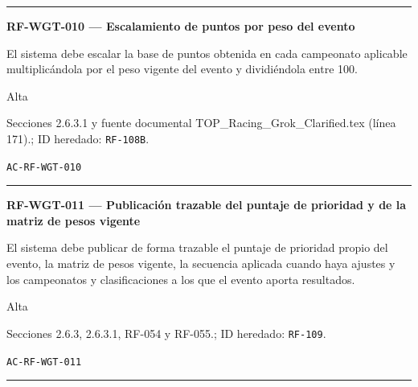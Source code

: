 \documentclass[10pt,letterpaper]{article}
\begin{document}
\vspace{0.25em}\hrule\vspace{0.65em}
\noindent\textbf{RF-WGT-010 --- Escalamiento de puntos por peso del evento}\par
\begin{description}[style=nextline,leftmargin=3.15cm,labelwidth=2.8cm,font=\normalfont\bfseries]
\item[Obligación] El sistema debe escalar la base de puntos obtenida en cada campeonato aplicable multiplicándola por el peso vigente del evento y dividiéndola entre 100.
\item[Prioridad] Alta
\item[Procedencia] Secciones 2.6.3.1 y fuente documental TOP\_Racing\_Grok\_Clarified.tex (línea 171).; ID heredado: \texttt{RF-108B}.
\item[Verificación] \texttt{AC-RF-WGT-010}
\end{description}
\vspace{0.25em}\hrule\vspace{0.65em}
\noindent\textbf{RF-WGT-011 --- Publicación trazable del puntaje de prioridad y de la matriz de pesos vigente}\par
\begin{description}[style=nextline,leftmargin=3.15cm,labelwidth=2.8cm,font=\normalfont\bfseries]
\item[Obligación] El sistema debe publicar de forma trazable el puntaje de prioridad propio del evento, la matriz de pesos vigente, la secuencia aplicada cuando haya ajustes y los campeonatos y clasificaciones a los que el evento aporta resultados.
\item[Prioridad] Alta
\item[Procedencia] Secciones 2.6.3, 2.6.3.1, RF-054 y RF-055.; ID heredado: \texttt{RF-109}.
\item[Verificación] \texttt{AC-RF-WGT-011}
\end{description}
\vspace{0.25em}\hrule\vspace{0.65em}
\end{document}
